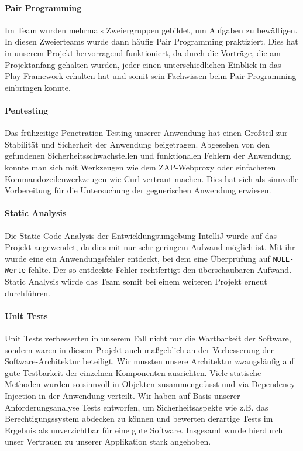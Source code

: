 \documentclass[12pt,DIV14,BCOR10mm,a4paper,parskip=half-,headsepline,headinclude,english,ngerman,bibliography=totocnumbered]{scrreprt}
\begin{document}
\paragraph{Pair Programming} Im Team wurden mehrmals Zweiergruppen gebildet, um Aufgaben zu bewältigen. In diesen Zweierteams wurde dann häufig Pair Programming praktiziert. Dies hat in unserem Projekt hervorragend funktioniert, da durch die Vorträge, die am Projektanfang gehalten wurden, jeder einen unterschiedlichen Einblick in das Play Framework erhalten hat und somit sein Fachwissen beim Pair Programming einbringen konnte.


\paragraph{Pentesting} Das frühzeitige Penetration Testing unserer Anwendung hat einen Großteil zur Stabilität und Sicherheit der Anwendung beigetragen. Abgesehen von den gefundenen Sicherheitsschwachstellen und funktionalen Fehlern der Anwendung, konnte man sich mit Werkzeugen wie dem ZAP-Webproxy oder  einfacheren Kommandozeilenwerkzeugen wie Curl vertraut machen. Dies hat sich als sinnvolle Vorbereitung für die Untersuchung der gegnerischen Anwendung erwiesen.

\paragraph{Static Analysis} Die Static Code Analysis der Entwicklungsumgebung IntelliJ wurde auf das Projekt angewendet, da dies mit nur sehr geringem Aufwand möglich ist. Mit ihr wurde eine ein Anwendungsfehler entdeckt, bei dem eine Überprüfung auf \texttt{NULL-Werte} fehlte. Der so entdeckte Fehler rechtfertigt den überschaubaren Aufwand. Static Analysis würde das Team somit bei einem weiteren Projekt erneut durchführen.

\paragraph{Unit Tests} Unit Tests verbesserten in unserem Fall nicht nur die Wartbarkeit der Software, sondern waren in diesem Projekt auch maßgeblich an der Verbesserung der Software-Architektur beteiligt. Wir mussten unsere Architektur zwangsläufig auf gute Testbarkeit der einzelnen Komponenten ausrichten. Viele statische Methoden wurden so sinnvoll in Objekten zusammengefasst und via Dependency Injection in der Anwendung verteilt. Wir haben auf Basis unserer Anforderungsanalyse Tests entworfen, um Sicherheitsaspekte wie z.B. das Berechtigungssystem abdecken zu können und bewerten derartige Tests im Ergebnis als unverzichtbar für eine gute Software. Insgesamt wurde hierdurch unser Vertrauen zu unserer Applikation stark angehoben.
\end{document}
